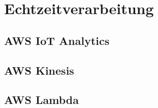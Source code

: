 \section{Echtzeitverarbeitung}


\subsection{AWS IoT Analytics}

\subsection{AWS Kinesis}

\subsection{AWS Lambda}